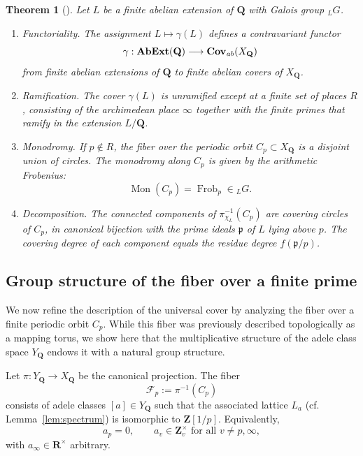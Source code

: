 \documentclass[11pt,a4paper]{article}
\newcommand{\Q}{\mathbf{Q}}
\newcommand{\Z}{\mathbf{Z}}
\newcommand{\R}{\mathbf{R}}
\theoremstyle{plain}
\newtheorem{thm}{Theorem}[section]
\theoremstyle{definition} %
\begin{document}
\begin{thm}[{\cite[Theorem~3.12]{CC3}}]
\label{main}
Let $L$ be a finite abelian extension of $\Q$ with Galois group ${}_LG$.
\begin{enumerate}
  \item[(i)] \emph{Functoriality.}
  The assignment $L \mapsto \gamma(L)$ defines a contravariant functor
  \[
  \gamma : \mathbf{AbExt}(\Q) \longrightarrow \mathbf{Cov}_{\emph{ab}}(X_\Q)
  \]
  from finite abelian extensions of $\Q$ to finite abelian covers of $X_\Q$.

  \item[(ii)] \emph{Ramification.}
  The cover $\gamma(L)$ is unramified except at a finite set of places $R$,
  consisting of the archimedean place $\infty$ together with the finite primes
  that ramify in the extension $L/\Q$.

  \item[(iii)] \emph{Monodromy.}
  If $p \notin R$, the fiber over the periodic orbit
  $C_p \subset X_\Q$ is a disjoint union of circles.
  The monodromy along $C_p$ is given by the arithmetic Frobenius:
  \[
  \operatorname{Mon}(C_p) = \operatorname{Frob}_p \in {}_LG .
  \]

  \item[(iv)] \emph{Decomposition.}
  The connected components of $\pi_{\chi_L}^{-1}(C_p)$ are covering circles of $C_p$,
  in canonical bijection with the prime ideals $\mathfrak{p}$ of $L$ lying above $p$.
  The covering degree of each component equals the residue degree
  $f(\mathfrak{p}/p)$.
\end{enumerate}
\end{thm}



\subsection{Group structure of the fiber over a finite prime}\label{fibers}

We now refine the description of the universal cover by analyzing the fiber over a
finite periodic orbit $C_p$.  While this fiber was previously described topologically
as a mapping torus, we show here that the multiplicative structure of the adele class
space $Y_\Q$ endows it with a natural group structure.

Let $\pi : Y_\Q \to X_\Q$ be the canonical projection.  The fiber
\[
\mathcal{F}_p := \pi^{-1}(C_p)
\]
consists of adele classes $[a]\in Y_\Q$ such that the associated lattice $L_a$ (cf. Lemma~\ref{lem:spectrum}) is isomorphic
to $\Z[1/p]$.  Equivalently,
\[
a_p = 0, \qquad a_v \in \Z_v^\times \text{ for all } v \neq p,\infty,
\]
with $a_\infty \in \R^\times$ arbitrary.
\end{document}
